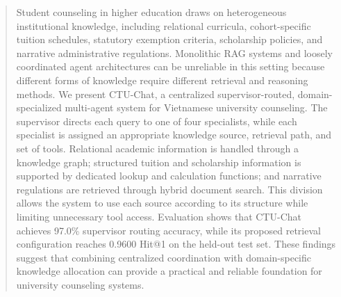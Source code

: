 \begin{abstract}
Student counseling in higher education draws on heterogeneous institutional knowledge, including relational curricula, cohort-specific tuition schedules, statutory exemption criteria, scholarship policies, and narrative administrative regulations. Monolithic RAG systems and loosely coordinated agent architectures can be unreliable in this setting because different forms of knowledge require different retrieval and reasoning methods. We present CTU-Chat, a centralized supervisor-routed, domain-specialized multi-agent system for Vietnamese university counseling. The supervisor directs each query to one of four specialists, while each specialist is assigned an appropriate knowledge source, retrieval path, and set of tools. Relational academic information is handled through a knowledge graph; structured tuition and scholarship information is supported by dedicated lookup and calculation functions; and narrative regulations are retrieved through hybrid document search. This division allows the system to use each source according to its structure while limiting unnecessary tool access. Evaluation shows that CTU-Chat achieves 97.0\% supervisor routing accuracy, while its proposed retrieval configuration reaches 0.9600 Hit@1 on the held-out test set. These findings suggest that combining centralized coordination with domain-specific knowledge allocation can provide a practical and reliable foundation for university counseling systems.

\end{abstract}
